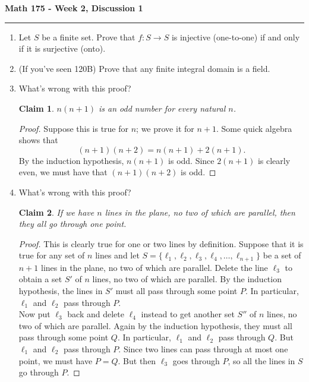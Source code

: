 \documentclass[11pt,letterpaper]{report}
\newtheorem*{claim*}{Claim}
\begin{document}
\begin{center}
{\bf \Large Math 175 - Week 2, Discussion 1}
\vspace{0.2cm}
\hrule
\end{center}

\begin{enumerate}
	\item Let $S$ be a finite set. Prove that $f: S\to S$ is injective (one-to-one) if and only if it is surjective (onto).\\

	\vfill

	\item (If you've seen 120B) Prove that any finite integral domain is a field.

	\vfill

	\item What's wrong with this proof?
	\begin{claim*}
		$n(n+1)$ is an odd number for every natural $n$.
	\end{claim*}
	\begin{proof}
		Suppose this is true for $n$; we prove it for $n+1$. Some quick algebra shows that
		\[
		(n+1)(n+2) = n(n+1) + 2(n+1).
		\]
		By the induction hypothesis, $n(n+1)$ is odd. Since $2(n+1)$ is clearly even, we must have that $(n+1)(n+2)$ is odd.
	\end{proof}
	\vfill

	\item What's wrong with this proof?
	\begin{claim*}
		If we have $n$ lines in the plane, no two of which are parallel, then they all go through one point.
	\end{claim*}
	\begin{proof}
		This is clearly true for one or two lines by definition. Suppose that it is true for any set of $n$ lines and let $S = \{\ell_1, \ell_2, \ell_3, \ell_4,  \ldots, \ell_{n+1}\}$ be a set of $n+1$ lines in the plane, no two of which are parallel. Delete the line $\ell_3$ to obtain a set $S'$ of $n$ lines, no two of which are parallel. By the induction hypothesis, the lines in $S'$ must all pass through some point $P$. In particular, $\ell_1$ and $\ell_2$ pass through $P$.\\

		\noindent Now put $\ell_3$ back and delete $\ell_4$ instead to get another set $S''$ of $n$ lines, no two of which are parallel. Again by the induction hypothesis, they must all pass through some point $Q$. In particular, $\ell_1$ and $\ell_2$ pass through $Q$. But $\ell_1$ and $\ell_2$ pass through $P$. Since two lines can pass through at most one point, we must have $P = Q$. But then $\ell_3$ goes through $P$, so all the lines in $S$ go through $P$.
	\end{proof}


\end{enumerate}
\end{document}
